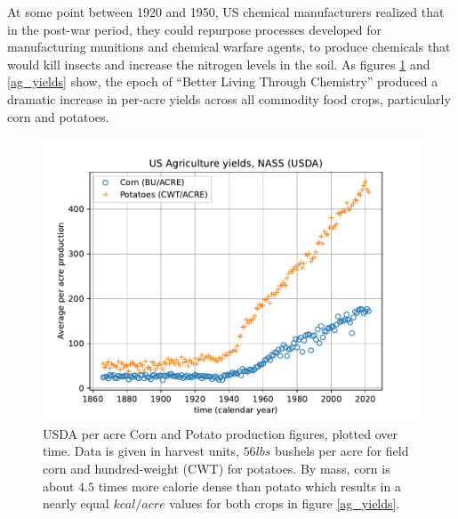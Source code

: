 \documentclass[man]{apa7}
\begin{document}
At some point between 1920 and 1950, US chemical manufacturers realized that in the post-war period, they could repurpose processes developed for manufacturing munitions and chemical warfare agents, to produce chemicals that would kill insects and increase the nitrogen levels in the soil. 
As figures \ref{corn_and_potato_yields} and \ref{ag_yields} show, the epoch of ``Better Living Through Chemistry'' produced a dramatic increase in per-acre yields across all commodity food crops, particularly corn and potatoes.  

\begin{figure}[ht!]
\centering
\includegraphics[width=\columnwidth]{corn_potatoes_raw_production_per_acre.pdf}
\caption{
USDA per acre Corn and Potato production figures, plotted over time.  Data is given in harvest units, $56lbs$ bushels per acre for field corn and hundred-weight (CWT) for potatoes.  By mass, corn is about $4.5$ times more calorie dense than potato which results in a nearly equal $kcal/acre$ values for both crops in figure \ref{ag_yields}.
}
\label{corn_and_potato_yields}
\end{figure}
\end{document}
